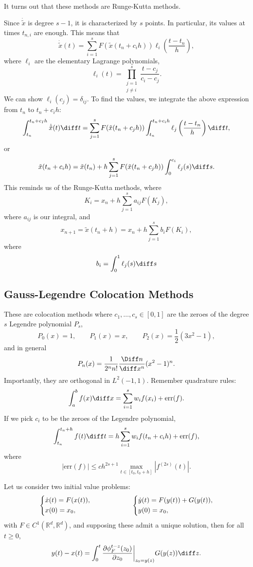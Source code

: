 \documentclass[12pt]{article}
\begin{document}
It turns out that these methods are Runge-Kutta methods.
\begin{proofbox}
	Since $\dot{\tilde x}$ is degree $s-1$, it is characterized by $s$ points. In particular, its values at times $t_{n,i}$ are enough. This means that
	\[
		\dot{\tilde x}(t) = \sum_{i = 1}^s F(\tilde x(t_n + c_i h)) \ell_i \left(\frac{t - t_n}{h} \right),
	\]
	where $\ell_i$ are the elementary Lagrange polynomials,
	\[
		\ell_i(t) = \prod_{\substack{j=1\\j \neq i}}^s \frac{t - c_j}{c_i - c_j}.
	\]
	We can show $\ell_i(c_j) = \delta_{ij}$.
	To find the values, we integrate the above expression from $t_n$ to $t_n + c_i h$:
	\[
		\int_{t_n}^{t_n + c_I h} \dot{\tilde x}(t) \diff t = \sum_{j = 1}^s F(\tilde x (t_n + c_j h)) \int_{t_n}^{t_n + c_i h} \ell_j \left( \frac{t - t_n}{h} \right) \diff t,
	\]
	or
	\[
	\tilde x(t_n + c_i h) = \tilde x(t_n) + h \sum_{j = 1}^s F(\tilde x(t_n + c_j h)) \int_0^{c_i} \ell_j(s) \diff s.
	\]
	This reminds us of the Runge-Kutta methods, where
	\[
	K_i = x_n + h \sum_{j = 1}^s a_{ij} F(K_j),
	\]
	where $a_{ij}$ is our integral, and
	\[
	x_{n+1} = \tilde x(t_n + h) = x_n + h \sum_{j = 1}^s b_i F(K_i),
	\]
	where
	\[
	b_i = \int_0^{1} \ell_j(s) \diff s
	\]
\end{proofbox}

\subsection{Gauss-Legendre Colocation Methods}%
\label{sub:glcm}

These are colocation methods where $c_1, \ldots, c_s \in [0, 1]$ are the zeroes of the degree $s$ Legendre polynomial $P_s$,
\[
P_0(x) = 1, \qquad P_1(x) = x, \qquad P_2(x) = \frac 12 (3x^2 - 1),
\]
and in general
\[
P_n(x) = \frac{1}{2^{n}n!} \frac{\Diff n}{\diff x^{n}} (x^2 - 1)^{n}.
\]
Importantly, they are orthogonal in $L^2(-1, 1)$. Remember quadrature rules:
\[
\int_a^b f(x) \diff x = \sum_{i=1}^s w_i f(x_i) + \mathrm{err}(f).
\]
If we pick $c_i$ to be the zeroes of the Legendre polynomial,
\[
\int_{t_n}^{t_n + h} f(t) \diff t = h \sum_{i = 1}^s w_i f(t_n + c_i h) + \mathrm{err}(f),
\]
where
\[
	|\mathrm{err}(f)| \leq c h^{2s+1} \max_{t \in [t_0, t_0 + h]} |f^{(2s)}(t)|.
\]

\begin{proposition}
	Let us consider two initial value problems:
	\begin{align*}
		\begin{dcases}
			\dot x(t) = F(x(t)), \\
			x(0) = x_0,
		\end{dcases}
		\qquad \qquad \qquad
		\begin{dcases}
			\dot y(t) = F(y(t)) + G(y(t)), \\
			y(0) = x_0,
		\end{dcases}
	\end{align*}
	with $F \in C^1(\mathbb{R}^d, \mathbb{R}^d)$, and supposing these admit a unique solution, then for all $t \geq 0$,
	\[
	y(t) - x(t) = \int_0^t \frac{\partial \phi_F^{t - z}(z_0)}{\partial z_0} \biggr|_{z_0 = y(z)}  G(y(z)) \diff z.
	\]
\end{proposition}
\end{document}
